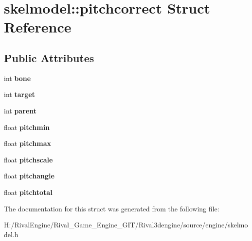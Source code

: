 \hypertarget{structskelmodel_1_1pitchcorrect}{}\section{skelmodel\+:\+:pitchcorrect Struct Reference}
\label{structskelmodel_1_1pitchcorrect}
\subsection*{Public Attributes}
\begin{DoxyCompactItemize}
\item 
\mbox{\label{structskelmodel_1_1pitchcorrect_aab262ff40f014165a45a7355bf9b5c93}} 
int {\bfseries bone}
\item 
\mbox{\label{structskelmodel_1_1pitchcorrect_a0c7ce38344ae4ebb9855cce30b562d4d}} 
int {\bfseries target}
\item 
\mbox{\label{structskelmodel_1_1pitchcorrect_a5dc896d653bd69c1f3bf8021d410826a}} 
int {\bfseries parent}
\item 
\mbox{\label{structskelmodel_1_1pitchcorrect_aee552db10f5f5b99a5ae581683252b0b}} 
float {\bfseries pitchmin}
\item 
\mbox{\label{structskelmodel_1_1pitchcorrect_a967e737637bb99703866ca2baaa8f1bf}} 
float {\bfseries pitchmax}
\item 
\mbox{\label{structskelmodel_1_1pitchcorrect_a7d9ae0434fb2d18ec225f487e5d7cf80}} 
float {\bfseries pitchscale}
\item 
\mbox{\label{structskelmodel_1_1pitchcorrect_a4d36109f1322e534fed021d8401e293c}} 
float {\bfseries pitchangle}
\item 
\mbox{\label{structskelmodel_1_1pitchcorrect_a191a879a242b5259560b22391d57f7aa}} 
float {\bfseries pitchtotal}
\end{DoxyCompactItemize}


The documentation for this struct was generated from the following file\+:\begin{DoxyCompactItemize}
\item 
H\+:/\+Rival\+Engine/\+Rival\+\_\+\+Game\+\_\+\+Engine\+\_\+\+G\+I\+T/\+Rival3dengine/source/engine/skelmodel.\+h\end{DoxyCompactItemize}
